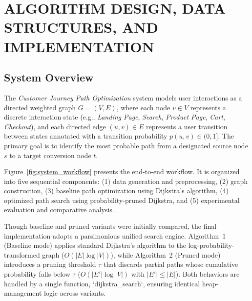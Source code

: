 \chapter{ALGORITHM DESIGN, DATA STRUCTURES, AND IMPLEMENTATION}\label{chap:methodology}

\section{System Overview}

The \textit{Customer Journey Path Optimization} system models user interactions as a directed weighted graph $G = (V, E)$, where each node $v \in V$ represents a discrete interaction state (e.g., \textit{Landing Page}, \textit{Search}, \textit{Product Page}, \textit{Cart}, \textit{Checkout}), and each directed edge $(u,v) \in E$ represents a user transition between states annotated with a transition probability $p(u,v) \in (0,1]$. The primary goal is to identify the most probable path from a designated source node $s$ to a target conversion node $t$.

Figure~\ref{fig:system_workflow} presents the end-to-end workflow. It is organized into five sequential components: (1) data generation and preprocessing, (2) graph construction, (3) baseline path optimization using Dijkstra's algorithm, (4) optimized path search using probability-pruned Dijkstra, and (5) experimental evaluation and comparative analysis.

Though baseline and pruned variants were initially compared, the final implementation adopts a parsimonious unified search engine. Algorithm~1 (Baseline mode) applies standard Dijkstra's algorithm to the log-probability-transformed graph ($O(|E|\log|V|)$), while Algorithm~2 (Pruned mode) introduces a pruning threshold $\tau$ that discards partial paths whose cumulative probability falls below $\tau$ ($O(|E'|\log|V|)$ with $|E'| \leq |E|$). Both behaviors are handled by a single function, `dijkstra_search`, ensuring identical heap-management logic across variants.

